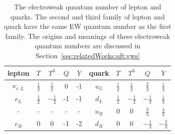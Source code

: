 \begin{table}[ht]
    \centering
    \setlength{\tabcolsep}{1.2em}
    \renewcommand{\arraystretch}{1.2}
    \begin{tabular}{ccccc|ccccc}
    \hline
    lepton      & $T$           & $T^3$          & $Q$ & $Y$ & quark  & $T$           & $T^3$          & $Q$            & $Y$            \\
    \hline
    $\nu_{e,L}$ & $\frac{1}{2}$ & $\frac{1}{2}$  & 0   & -1  & $u_L$  & $\frac{1}{2}$ & $\frac{1}{2}$  & $\frac{2}{3}$  & $\frac{1}{3}$  \\
    $e_L$       & $\frac{1}{2}$ & $-\frac{1}{2}$ & -1  & -1  & $d_L$  & $\frac{1}{2}$ & $-\frac{1}{2}$ & $-\frac{1}{3}$ & $\frac{1}{3}$  \\
    \hline
    -           & -             & -              & -   & -   & $u_R$  & 0             & 0              & $\frac{2}{3}$  & $\frac{4}{3}$  \\
    $e_R$       & 0             & 0              & -1  & -2  & $d_R$  & 0             & 0              & $-\frac{1}{3}$ & $-\frac{2}{3}$ \\
    \hline
    \end{tabular}
    \caption{The electroweak quantum number of lepton and quarks. The second and third family of lepton and quark have the same EW quantum number as the first family. The origins and meanings of these electroweak quantum numbers are discussed in Section~\ref{sec:relatedWorks:qft:gws}}
    \label{tab:relatedWorks:smParticles:ewQuantumNumber}
\end{table}



